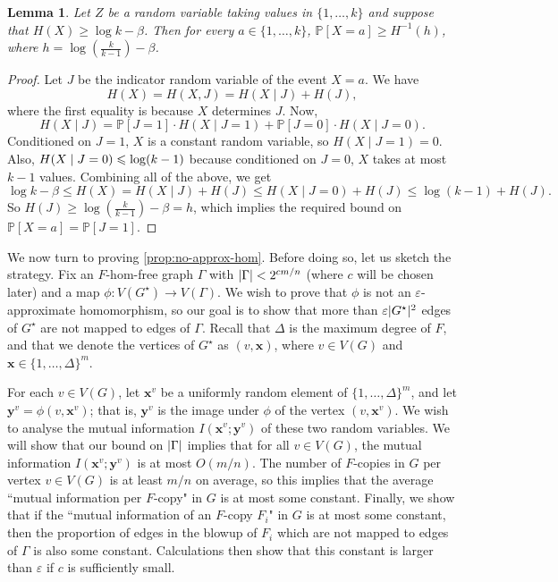 \documentclass[reqno, english, 12pt]{amsart}
\theoremstyle{plain}
\newtheorem{lemma}[theorem]{Lemma}
\theoremstyle{remark}
\newcommand{\bx}{\mathbf{x}}
\newcommand{\by}{\mathbf{y}}
\DeclarePairedDelimiter{\abs}{\lvert}{\rvert}
\renewcommand{\leq}{\leqslant}
\renewcommand{\geq}{\geqslant}
\newcommand{\eps}{\ensuremath{\varepsilon}}
\begin{document}
\begin{lemma}\label{lem:large entropy implies large probability of all outcomes}
	Let $Z$ be a random variable taking values in $\{1,\dots,k\}$ and suppose that $H(X) \geq \log k - \beta$. Then for every $a \in \{1,\dots,k\}$, $\mathbb{P}[X = a] \geq H^{-1}(h)$, where $h = \log(\frac{k}{k-1}) - \beta$. 
\end{lemma}
\begin{proof}
	Let $J$ be the indicator random variable of the event $X=a$. 
	We have
	$$
	H(X) = H(X,J) = H(X \mid J) + H(J),
	$$
	where the first equality is because $X$ determines $J$. Now,
	$$
	H(X \mid J) = \mathbb{P}[J = 1] \cdot H(X \mid J = 1) + 
	\mathbb{P}[J = 0] \cdot H(X \mid J = 0).
	$$
	Conditioned on $J=1$, $X$ is a constant random variable, so $H(X \mid J=1) = 0$. Also, $H(X \mid J= \nolinebreak 0) \leq \log(k-1)$ because conditioned on $J=0$, $X$ takes at most $k-1$ values. Combining all of the above, we get
	$$
	\log k - \beta \leq H(X) = H(X \mid J) + H(J) \leq H(X \mid J = 0) + H(J) \leq \log(k-1) + H(J).
	$$
	So $H(J) \geq \log(\frac{k}{k-1})-\beta=h$, which implies the required bound on $\mathbb{P}[X = a] = \mathbb{P}[J=1]$. 
\end{proof}

We now turn to proving \cref{prop:no-approx-hom}. Before doing so, let us sketch the strategy. Fix an $F$-hom-free graph $\Gamma$ with $\abs{\Gamma} < 2^{c m/n}$ (where $c$ will be chosen later) and a map $\phi:V(G^{\star})\rightarrow V(\Gamma)$. We wish to prove that $\phi$ is not an $\varepsilon$-approximate homomorphism, so our goal is to show that more than $\varepsilon \abs{G^{\star}}^2$ edges of $G^{\star}$ are not mapped to edges of $\Gamma$. 
	Recall that $\Delta$ is the maximum degree of $F$, and that we denote the vertices of $G^{\star}$ as $(v,\bx)$, where $v \in V(G)$ and $\bx\in\{1,\dots,\Delta\}^m$.
	

	For each $v \in V(G)$, let $\bx^v$ be a uniformly random element of $\{1,\dots,\Delta\}^m$, and let $\by^v = \phi(v,\bx^v)$; that is, $\by^v$ is the image under $\phi$ of the vertex $(v,\bx^v)$. 
	We wish to analyse the mutual information $I(\bx^v;\by^v)$ of these two random variables. 
	We will show that our bound on $\abs{\Gamma}$ implies that for all $v\in V(G)$, the mutual information $I(\bx^v;\by^v)$ is at most $O(m/n)$. 
	The number of $F$-copies in $G$ per vertex $v \in V(G)$ is at least $m/n$ on average, so this implies that the average ``mutual information per $F$-copy" in $G$ is at most some constant. 
	Finally, we show that if the ``mutual information of an $F$-copy $F_i$" in $G$ is at most some constant, then the proportion of edges in the blowup of $F_i$ which are not mapped to edges of $\Gamma$ is also some constant. 
	Calculations then show that this constant is larger than $\eps$ if $c$ is sufficiently small.
\end{document}

